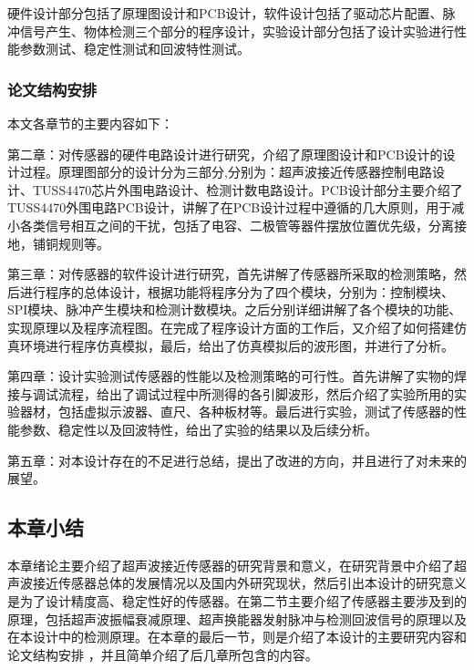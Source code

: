 硬件设计部分包括了原理图设计和PCB设计，软件设计包括了驱动芯片配置、脉冲信号产生、物体检测三个部分的程序设计，实验设计部分包括了设计实验进行性能参数测试、稳定性测试和回波特性测试。

\subsubsection{论文结构安排}
本文各章节的主要内容如下：

第二章：对传感器的硬件电路设计进行研究，介绍了原理图设计和PCB设计的设计过程。原理图部分的设计分为三部分,分别为：超声波接近传感器控制电路设计、TUSS4470芯片外围电路设计、检测计数电路设计。PCB设计部分主要介绍了TUSS4470外围电路PCB设计，讲解了在PCB设计过程中遵循的几大原则，用于减小各类信号相互之间的干扰，包括了电容、二极管等器件摆放位置优先级，分离接地，铺铜规则等。

第三章：对传感器的软件设计进行研究，首先讲解了传感器所采取的检测策略，然后进行程序的总体设计，根据功能将程序分为了四个模块，分别为：控制模块、SPI模块、脉冲产生模块和检测计数模块。之后分别详细讲解了各个模块的功能、实现原理以及程序流程图。在完成了程序设计方面的工作后，又介绍了如何搭建仿真环境进行程序仿真模拟，最后，给出了仿真模拟后的波形图，并进行了分析。


第四章：设计实验测试传感器的性能以及检测策略的可行性。首先讲解了实物的焊接与调试流程，给出了调试过程中所测得的各引脚波形，然后介绍了实验所用的实验器材，包括虚拟示波器、直尺、各种板材等。最后进行实验，测试了传感器的性能参数、稳定性以及回波特性，给出了实验的结果以及后续分析。


第五章：对本设计存在的不足进行总结，提出了改进的方向，并且进行了对未来的展望。


    \subsection{本章小结}
    本章绪论主要介绍了超声波接近传感器的研究背景和意义，在研究背景中介绍了超声波接近传感器总体的发展情况以及国内外研究现状，然后引出本设计的研究意义是为了设计精度高、稳定性好的传感器。在第二节主要介绍了传感器主要涉及到的原理，包括超声波振幅衰减原理、超声换能器发射脉冲与检测回波信号的原理以及在本设计中的检测原理。在本章的最后一节，则是介绍了本设计的主要研究内容和论文结构安排
    ，并且简单介绍了后几章所包含的内容。